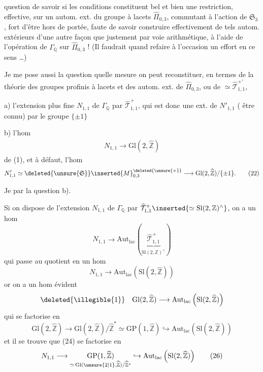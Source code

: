 
question de savoir si les conditions constituent bel et bien une restriction, effective, sur un autom. ext. du groupe à lacets $\widehat{\Pi}_{0,3}$, commutant à l'action de $\mathfrak{S}_3$,  fort d'être hors de portée, faute de savoir construire effectivement de tels autom. extérieurs  d'une autre façon que justement par voie arithmétique, à l'aide de l'opération de $\Gamma_{\mathbb{Q}}$ sur $\widehat{\Pi}_{0,3}$ ! (Il faudrait quand  refaire à l'occasion un effort en ce sens \ldots)

Je me pose aussi la question  quelle mesure on peut reconstituer, en termes de la théorie des groupes profinis à lacets et des  autom. ext. de $\widehat{\Pi}_{0,3}$, ou de  $\simeq \widehat{\mathcal{T}}_{1,1}^{+\prime}$, 



a) l'extension plus fine $N_{1,1}$ de $\Gamma_{\mathbb{Q}}$ par $\widehat{\mathcal{T}}_{1,1}^{+}$, qui est donc une ext. de $N'_{1,1}$ ( être connu) par le groupe $\{\pm1\}$

b) l'hom
\[
\begin{array}{|c|}
\hline
N_{1,1}\longrightarrow \mathrm{Gl}(2,\widehat{\mathbb{Z}})
\end{array}
\tag{21}
\]
de (1), et à défaut, l'hom
\[
N'_{1,1}\simeq
\deleted{\unsure{\mathfrak{S}}}\inserted{M}_{0,3}^{\deleted{\unsure{+}}}
\longrightarrow
\mathrm{Gl}(2,\widehat{\mathbb{Z}})/\{\pm1\}.
\tag{22}
\]

Je  par la question b).

Si on dispose de l'extension $N_{1,1}$ de $\Gamma_{\mathbb{Q}}$ par $\widehat{\mathcal{T}}_{1,1}^{+}\inserted{\simeq\mathrm{Sl}(2,\mathbb{Z})^{\wedge}}$, on a un hom
\[
N_{1,1}\longrightarrow
\mathrm{Aut}_{\mathrm{lac}}
\left(\underbrace{\widehat{\mathcal{T}}_{1,1}^{+}}_{\mathrm{Sl}(2,\mathbb{Z})^{\wedge}}\right)
\tag{23}
\]
qui passe au quotient en un hom
\[
N_{1,1}\longrightarrow
\mathrm{Aut}_{\mathrm{lac}}\left(\mathrm{Sl}(2,\widehat{\mathbb{Z}})\right)
\tag{24}
\]
or on a un hom évident
\[
\deleted{\illegible{1}}\quad
\mathrm{Gl}(2,\widehat{\mathbb{Z}})
\longrightarrow
\mathrm{Aut}_{\mathrm{lac}}\left(\mathrm{Sl}(2,\widehat{\mathbb{Z}})\right)
\]
qui se factorise en
\[
\mathrm{Gl}(2,\widehat{\mathbb{Z}})
\longrightarrow
\mathrm{Gl}(2,\widehat{\mathbb{Z}})/\widehat{\mathbb{Z}}^{*}
\simeq \mathrm{GP}(1,\widehat{\mathbb{Z}})
\hookrightarrow
\mathrm{Aut}_{\mathrm{lac}}\left(\mathrm{Sl}(2,\widehat{\mathbb{Z}})\right)
\tag{25}
\]
et il se trouve que (24) se factorise en
\[
N_{1,1}\longrightarrow
\underset{\simeq\,\mathrm{Gl}(\unsure{2|1},\widehat{\mathbb{Z}})/\widehat{\mathbb{Z}}^{*}}
{\mathrm{GP}(1,\widehat{\mathbb{Z}})}
\hookrightarrow
\mathrm{Aut}_{\mathrm{lac}}\left(\mathrm{Sl}(2,\widehat{\mathbb{Z}})\right)
\tag{26}
\]

